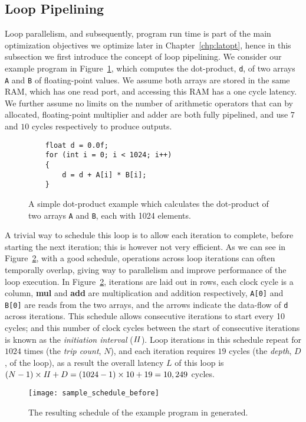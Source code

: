 \subsection{Loop Pipelining}
\label{bg:sub:loop_pipelining}

Loop parallelism, and subsequently, program run time is part of the main
optimization objectives we optimize later in Chapter~\ref{chp:latopt}, hence
in this subsection we first introduce the concept of loop pipelining.  We
consider our example program in Figure~\ref{bg:lst:dotprod}, which computes the
dot-product, \verb|d|, of two arrays \verb|A| and \verb|B| of floating-point
values.  We assume both arrays are stored in the same RAM, which has one read
port, and accessing this RAM has a one cycle latency.  We further assume
no limits on the number of arithmetic operators that can by allocated,
floating-point multiplier and adder are both fully pipelined, and use $7$ and
$10$ cycles respectively to produce outputs.
\begin{figure}[ht]
    \centering
    \begin{minipage}{0.7\textwidth}
    \begin{lstlisting}
    float d = 0.0f;
    for (int i = 0; i < 1024; i++)
    {
        d = d + A[i] * B[i];
    }
    \end{lstlisting}
    \end{minipage}
    \caption{%
        A simple dot-product example which calculates the dot-product of two
        arrays \texttt{A} and \texttt{B}, each with 1024 elements.
    }\label{bg:lst:dotprod}
\end{figure}

A trivial way to schedule this loop is to allow each iteration to complete,
before starting the next iteration; this is however not very efficient.
As we can see in Figure~\ref{bg:fig:sample_schedule_before}, with a good
schedule, operations across loop iterations can often temporally overlap,
giving way to parallelism and improve performance of the loop execution.  In
Figure~\ref{bg:fig:sample_schedule_before}, iterations are laid out in rows,
each clock cycle is a column, \textbf{mul} and \textbf{add} are multiplication
and addition respectively, \verb|A[0]| and \verb|B[0]| are reads from the two
arrays, and the arrows indicate the data-flow of \verb|d| across iterations.
This schedule allows consecutive iterations to start every 10 cycles; and this
number of clock cycles between the start of consecutive iterations is known
as the \emph{initiation interval} ($\mathit{II}$).  Loop iterations in this schedule
repeat for $1024$ times (the \emph{trip count}, $N$), and each iteration
requires $19$ cycles (the \emph{depth}, $D$, of the loop), as a result the
overall latency $L$ of this loop is $(N - 1) \times \mathit{II} + D = (1024 - 1) \times
10 + 19 = 10,249$ cycles.
\begin{figure}[ht]
    \centering
    \texttt{[image: sample\_schedule\_before]}
    \caption{%
        The resulting schedule of the example program in generated.
    }\label{bg:fig:sample_schedule_before}
\end{figure}

